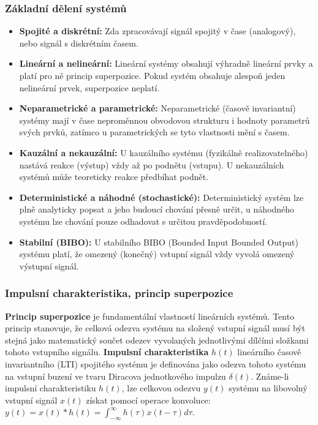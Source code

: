     \subsubsection{Základní dělení systémů}
        \begin{itemize}
            \item \textbf{Spojité a diskrétní:} Zda zpracovávají signál spojitý v čase (analogový), nebo signál s diskrétním časem.
            \item \textbf{Lineární a nelineární:} Lineární systémy obsahují výhradně lineární prvky a platí pro ně  princip superpozice. Pokud systém obsahuje alespoň jeden nelineární prvek, superpozice neplatí.
            \item \textbf{Neparametrické a parametrické:} Neparametrické (časově invariantní) systémy mají v čase neproměnnou obvodovou strukturu i hodnoty parametrů svých prvků, zatímco u parametrických se tyto vlastnosti mění s časem.
            \item \textbf{Kauzální a nekauzální:} U kauzálního systému (fyzikálně realizovatelného) nastává reakce (výstup) vždy až po podnětu (vstupu). U nekauzálních systémů může teoreticky reakce předbíhat podnět.
            \item \textbf{Deterministické a náhodné (stochastické):} Deterministický systém lze plně analyticky popsat a jeho budoucí chování přesně určit, u náhodného systému lze chování pouze odhadovat s určitou pravděpodobností.
            \item \textbf{Stabilní (BIBO):} U stabilního BIBO (Bounded Input Bounded Output) systému platí, že omezený (konečný) vstupní signál vždy vyvolá omezený výstupní signál.
        \end{itemize}
    \subsubsection{Impulsní charakteristika, princip superpozice}
        \textbf{Princip superpozice} je fundamentální vlastností lineárních systémů. Tento princip stanovuje, že celková odezva systému na složený vstupní signál musí být stejná jako matematický součet odezev vyvolaných jednotlivými dílčími složkami tohoto vstupního signálu. \textbf{Impulsní charakteristika} $h(t)$ lineárního časově invariantního (LTI) spojitého systému je definována jako odezva tohoto systému na vstupní buzení ve tvaru Diracova jednotkového impulzu $\delta(t)$. Známe-li impulsní charakteristiku $h(t)$, lze celkovou odezvu $y(t)$ systému na libovolný vstupní signál $x(t)$ získat pomocí operace konvoluce: $y(t) = x(t) * h(t) = \int_{-\infty}^{\infty} h(\tau)x(t - \tau)d\tau$.
